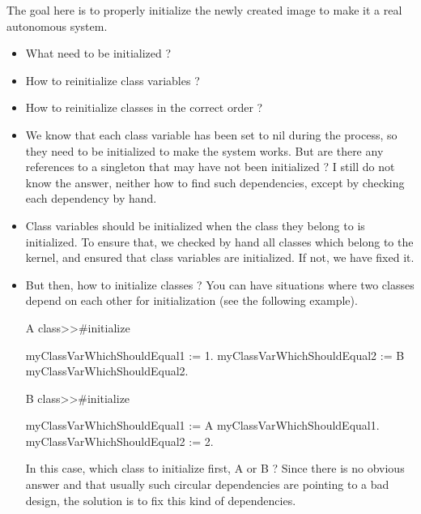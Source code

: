 \goal The goal here is to properly initialize the newly created image to make it a real autonomous system.

\problems
\begin{itemize}
	\item What need to be initialized ?
	\item How to reinitialize class variables ?
	\item How to reinitialize classes in the correct order ?
\end{itemize}

\solutions
\begin{itemize}
	\item We know that each class variable has been set to nil during the process, so they need to be initialized to make the system works. But are there any references to a singleton that may have not been initialized ? I still do not know the answer, neither how to find such dependencies, except by checking each dependency by hand.
	\item Class variables should be initialized when the class they belong to is initialized. To ensure that, we checked by hand all classes which belong to the kernel, and ensured that class variables are initialized. If not, we have fixed it.
	\item But then, how to initialize classes ? You can have situations where two classes depend on each other for initialization (see the following example).
	\begin{code}{}\label{initializationCross}
A class>>#initialize
	
\tab myClassVarWhichShouldEqual1 := 1.
\tab myClassVarWhichShouldEqual2 := B myClassVarWhichShouldEqual2.
	
B class>>#initialize
	
\tab myClassVarWhichShouldEqual1 := A myClassVarWhichShouldEqual1.
\tab myClassVarWhichShouldEqual2 := 2.
	\end{code}
In this case, which class to initialize first, A or B ? Since there is no obvious answer and that usually such circular dependencies are pointing to a bad design, the solution is to fix this kind of dependencies.
\end{itemize}
	